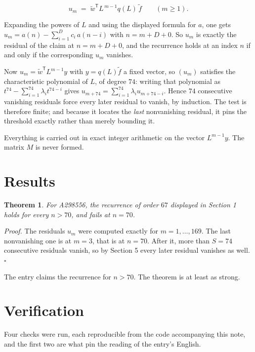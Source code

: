 \documentclass[11pt]{article}
\newtheorem{theorem}{Theorem}
\theoremstyle{definition}
\begin{document}
\[u_m \;=\; \tilde w^{\mathsf T} L^{\,m-1} q(L)\,\tilde f \qquad (m \ge 1).\]

Expanding the powers of $L$ and using the displayed formula for $a$, one gets $u_m = a(n) - \sum_{i=1}^{D} c_i\,a(n-i)$ with $n = m + D + 0$. So $u_m$ is exactly the residual of the claim at $n = m + D + 0$, and the recurrence holds at an index $n$ if and only if the corresponding $u_m$ vanishes.

Now $u_m = \tilde w^{\mathsf T} L^{m-1} y$ with $y = q(L)\tilde f$ a fixed vector, so $(u_m)$ satisfies the characteristic polynomial of $L$, of degree $74$: writing that polynomial as $t^{74} - \sum_{i=1}^{74} \lambda_i t^{74-i}$ gives $u_{m+74} = \sum_{i=1}^{74} \lambda_i u_{m+74-i}$. Hence $74$ consecutive vanishing residuals force every later residual to vanish, by induction. The test is therefore finite; and because it locates the {\itshape last} nonvanishing residual, it pins the threshold exactly rather than merely bounding it.

Everything is carried out in exact integer arithmetic on the vector $L^{m-1}y$. The matrix $M$ is never formed.

\section{Results}

\begin{theorem} For A298556, the recurrence of order $67$ displayed in Section 1 holds for every $n > 70$, and fails at $n = 70$.\end{theorem}

{\itshape Proof.} The residuals $u_m$ were computed exactly for $m = 1,\dots,169$. The last nonvanishing one is at $m = 3$, that is at $n = 70$. After it, more than $S = 74$ consecutive residuals vanish, so by Section 5 every later residual vanishes as well. $\square$

The entry claims the recurrence for $n > 70$. The theorem is at least as strong.

\section{Verification}

Four checks were run, each reproducible from the code accompanying this note, and the first two are what pin the reading of the entry's English.
\end{document}
